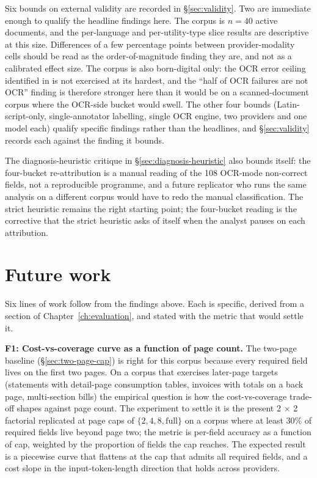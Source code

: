 Six bounds on external validity are recorded in \S\ref{sec:validity}. Two are
immediate enough to qualify the headline findings here. The corpus is
$n = 40$ active documents, and the per-language and per-utility-type slice
results are descriptive at this size. Differences of a few percentage points
between provider-modality cells should be read as the order-of-magnitude
finding they are, and not as a calibrated effect size. The corpus is also
born-digital only: the OCR error ceiling identified in
\cite{lopresti2009ocr} is not exercised at its hardest, and the
``half of OCR failures are not OCR'' finding is therefore stronger here than
it would be on a scanned-document corpus where the OCR-side bucket would
swell. The other four bounds (Latin-script-only, single-annotator labelling,
single OCR engine, two providers and one model each) qualify specific
findings rather than the headlines, and \S\ref{sec:validity} records each
against the finding it bounds.

The diagnosis-heuristic critique in \S\ref{sec:diagnosis-heuristic} also
bounds itself: the four-bucket re-attribution is a manual reading of the
108 OCR-mode non-correct fields, not a reproducible programme, and a
future replicator who runs the same analysis on a different corpus would
have to redo the manual classification. The strict heuristic remains the
right starting point; the four-bucket reading is the corrective that the
strict heuristic asks of itself when the analyst pauses on each
attribution.

\section{Future work}
\label{sec:future-work}

Six lines of work follow from the findings above. Each is specific, derived
from a section of Chapter~\ref{ch:evaluation}, and stated with the metric
that would settle it.

\textbf{F1: Cost-vs-coverage curve as a function of page count.} The
two-page baseline (\S\ref{sec:two-page-cap}) is right for this corpus
because every required field lives on the first two pages. On a corpus that
exercises later-page targets (statements with detail-page consumption
tables, invoices with totals on a back page, multi-section bills) the
empirical question is how the cost-vs-coverage trade-off shapes against
page count. The experiment to settle it is the present 2 $\times$ 2
factorial replicated at page caps of $\{2, 4, 8, \mathrm{full}\}$ on a
corpus where at least 30\% of required fields live beyond page two; the
metric is per-field accuracy as a function of cap, weighted by the
proportion of fields the cap reaches. The expected result is a piecewise
curve that flattens at the cap that admits all required fields, and a cost
slope in the input-token-length direction that holds across providers.

